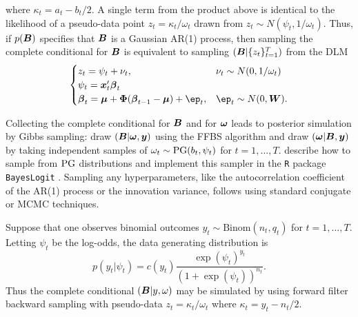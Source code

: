 where $\kappa_t = a_t - b_t / 2$.  A single term from the product above is
identical to the likelihood of a pseudo-data point $z_t = \kappa_t / \omega_t$
drawn from $z_t \sim N(\psi_t, 1/\omega_t)$.  Thus, if $p({\boldsymbol{B}})$ specifies
that ${\boldsymbol{B}}$ is a Gaussian AR(1) process, then sampling the complete
conditional for ${\boldsymbol{B}}$ is equivalent to sampling $({\boldsymbol{B}} | \{z_t\}_{t=1}^T)$
from the DLM
\[
\begin{cases}
  z_t = \psi_t + \nu_t, & \nu_t \sim N(0, 1/\omega_t) \\
  \psi_t = \vx_t' \bbeta_t \\
  \bbeta_t = \bmu + \bPhi (\bbeta_{t-1} - \bmu) + \vep_t, & \vep_t \sim N(0, \bW).
\end{cases}
\]

Collecting the complete conditional for ${\boldsymbol{B}}$ and for $\boldsymbol{\omega}$ leads to
posterior simulation by Gibbs sampling: draw $({\boldsymbol{B}}|\boldsymbol{\omega}, \boldsymbol{y})$ using the
FFBS algorithm and draw $(\boldsymbol{\omega} | {\boldsymbol{B}}, \boldsymbol{y})$ by taking independent samples
of $\omega_t \sim \text{PG}(b_t, \psi_t)$ for $t=1, \ldots, T$.
\citet{polson-etal-2013} describe how to sample from $\text{PG}$ distributions and
implement this sampler in the \texttt{R} package \texttt{BayesLogit}
\citep{bayeslogit-2013}.  Sampling any hyperparameters, like the autocorrelation
coefficient of the AR(1) process or the innovation variance, follows using
standard conjugate or MCMC techniques.

\begin{example}
  Suppose that one observes binomial outcomes $y_t \sim \text{Binom}(n_t, q_t)$
  for $t=1, \ldots, T$.  Letting $\psi_t$ be the log-odds, the data generating
  distribution is
  \[
  p(y_t | \psi_t) = c(y_t) \frac{\exp(\psi_t)^{y_t}}{(1+\exp({\psi_t}))^{n_t}}.
  \]
  Thus the complete conditional $({\boldsymbol{B}} | y, \omega)$ may be simulated by using
  forward filter backward sampling with pseudo-data $z_t = \kappa_t / \omega_t$
  where $\kappa_t = y_t - n_t / 2$.
\end{example}


